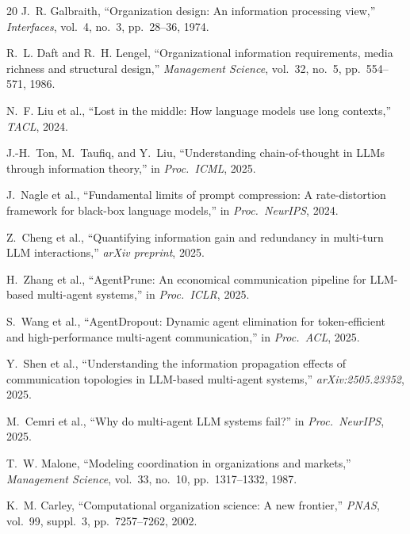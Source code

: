 \documentclass[conference]{IEEEtran}
\begin{document}
\begin{thebibliography}{20}
J.~R. Galbraith,
``Organization design: An information processing view,''
\emph{Interfaces}, vol.~4, no.~3, pp.~28--36, 1974.

R.~L. Daft and R.~H. Lengel,
``Organizational information requirements, media richness and structural design,''
\emph{Management Science}, vol.~32, no.~5, pp.~554--571, 1986.

N.~F. Liu et al.,
``Lost in the middle: How language models use long contexts,''
\emph{TACL}, 2024.

J.-H.~Ton, M.~Taufiq, and Y.~Liu,
``Understanding chain-of-thought in LLMs through information theory,''
in \emph{Proc.\ ICML}, 2025.

J.~Nagle et al.,
``Fundamental limits of prompt compression: A rate-distortion framework for black-box language models,''
in \emph{Proc.\ NeurIPS}, 2024.

Z.~Cheng et al.,
``Quantifying information gain and redundancy in multi-turn LLM interactions,''
\emph{arXiv preprint}, 2025.

H.~Zhang et al.,
``AgentPrune: An economical communication pipeline for LLM-based multi-agent systems,''
in \emph{Proc.\ ICLR}, 2025.

S.~Wang et al.,
``AgentDropout: Dynamic agent elimination for token-efficient and high-performance multi-agent communication,''
in \emph{Proc.\ ACL}, 2025.

Y.~Shen et al.,
``Understanding the information propagation effects of communication topologies in LLM-based multi-agent systems,''
\emph{arXiv:2505.23352}, 2025.

M.~Cemri et al.,
``Why do multi-agent LLM systems fail?''
in \emph{Proc.\ NeurIPS}, 2025.

T.~W. Malone,
``Modeling coordination in organizations and markets,''
\emph{Management Science}, vol.~33, no.~10, pp.~1317--1332, 1987.

K.~M. Carley,
``Computational organization science: A new frontier,''
\emph{PNAS}, vol.~99, suppl.~3, pp.~7257--7262, 2002.

\end{thebibliography}
\end{document}
